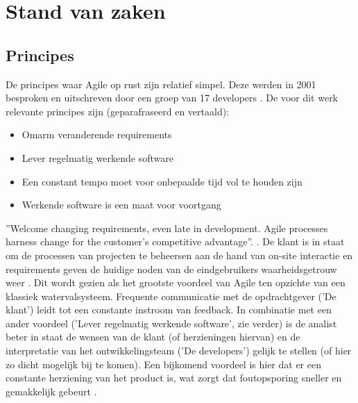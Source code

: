 
\section{Stand van zaken}
\label{sec:state-of-the-art}

%
%
%

\subsection{Principes}
De principes waar Agile op rust zijn relatief simpel. Deze werden in 2001 besproken en uitschreven door een groep van 17 developers \autocite{Beck2001}. De voor dit werk relevante principes zijn (geparafraseerd en vertaald):
\begin{itemize}
  \item Omarm veranderende requirements
  \item Lever regelmatig werkende software
  \item Een constant tempo moet voor onbepaalde tijd vol te houden zijn
  \item Werkende software is een maat voor voortgang
\end{itemize}

''Welcome changing requirements, even late in
development. Agile processes harness change for
the customer's competitive advantage''. \autocite{Beck2001}. De klant is in staat om de processen van projecten te beheersen  aan de hand van on-site interactie en requirements geven de huidige noden van de eindgebruikers waarheidsgetrouw weer \autocite{Kumar2012}. Dit wordt gezien als het grootste voordeel van Agile ten opzichte van een klassiek watervalsysteem. Frequente communicatie met de opdrachtgever ('De klant') leidt tot een constante instroom van feedback. In combinatie met een ander voordeel ('Lever regelmatig werkende software', zie verder) is de analist beter in staat de wensen van de klant (of herzieningen hiervan) en de interpretatie van het ontwikkelingsteam ('De developers') gelijk te stellen (of hier zo dicht mogelijk bij te komen). Een bijkomend voordeel is hier dat er een constante herziening van het product is, wat zorgt dat foutopsporing sneller en gemakkelijk gebeurt \autocite{Imreh2011}.

